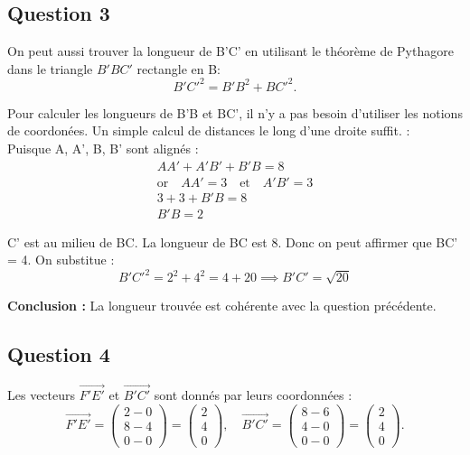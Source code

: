 \documentclass{exam}
\begin{document}
\subsection*{Question 3}

On peut aussi trouver la longueur de B'C' en utilisant le théorème de Pythagore dans le triangle \(B'BC'\) rectangle en B:
\[
B'C'^2 = B'B^2 + BC'^2.
\]

Pour calculer les longueurs de B'B et BC', il n'y a pas besoin d'utiliser les notions de coordonées. Un simple calcul de distances le long d'une droite suffit. : \\ 
Puisque A, A', B, B' sont alignés : 
\begin{align*}
  AA' + A'B' + B'B = 8 \\ 
  \text{or} \quad AA' = 3 \quad \text{et} \quad A'B' = 3 \\
  3 + 3 + B'B = 8 \\
  B'B = 2
\end{align*} 

\vspace{1em}
C' est au milieu de BC. La longueur de BC est 8. Donc on peut affirmer que BC' = 4.
\vspace{1em}
On substitue : \\ 
\[
  B'C'^2 = 2^2 + 4^2 = 4 + 20 \implies B'C' = \sqrt{20}
\]

\textbf{Conclusion :} La longueur trouvée est cohérente avec la question précédente.

\subsection*{Question 4}

Les vecteurs \(\overrightarrow{F'E'}\) et \(\overrightarrow{B'C'}\) sont donnés par leurs coordonnées :
\[
\overrightarrow{F'E'} = \begin{pmatrix}2 - 0 \\ 8 - 4 \\ 0 - 0\end{pmatrix} = \begin{pmatrix}2 \\ 4 \\ 0\end{pmatrix}, \quad 
\overrightarrow{B'C'} = \begin{pmatrix}8 - 6 \\ 4 - 0 \\ 0 - 0\end{pmatrix} = \begin{pmatrix}2 \\ 4 \\ 0\end{pmatrix}.
\]
\end{document}
